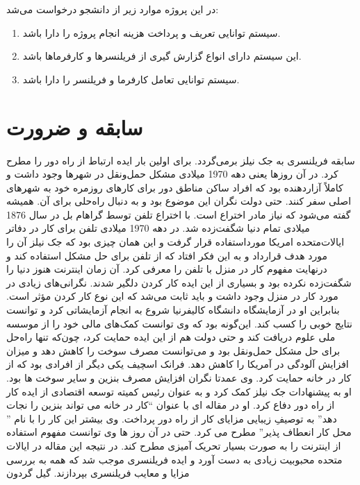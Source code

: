  در این پروژه موارد زیر از دانشجو درخواست می‌شد:
\begin{enumerate}
	\item
سیستم توانایی تعریف و پرداخت هزینه انجام پروژه را دارا باشد.
\item
این سیستم دارای انواع گزارش ‌گیری از فریلنسرها و کارفرماها باشد.
\item
سیستم توانایی تعامل کارفرما و فریلنسر را دارا باشد.
\end{enumerate}

\section{سابقه و ضرورت}
سابقه فریلنسری به جک نیلز 
برمی‌گردد. برای اولین بار ایده ارتباط از راه دور را مطرح کرد.
در آن روزها یعنی دهه 1970 میلادی مشکل حمل‌ونقل در شهرها وجود داشت و کاملاً آزاردهنده بود که افراد ساکن مناطق دور برای کارهای روزمره خود به شهرهای اصلی سفر کنند.
حتی دولت نگران این موضوع بود و به دنبال راه‌حلی برای آن. همیشه گفته می‌شود که نیاز مادر اختراع است.
با اختراع تلفن توسط گراهام بل در سال 1876 میلادی تمام دنیا شگفت‌زده شد. در دهه 1970 میلادی تلفن برای کار در دفاتر ایالات‌متحده امریکا مورداستفاده قرار گرفت و این همان چیزی بود که جک نیلز آن را مورد هدف قرارداد و به این فکر افتاد که از تلفن برای حل مشکل استفاده کند و درنهایت مفهوم کار در منزل با تلفن را معرفی کرد.
آن زمان اینترنت هنوز دنیا را شگفت‌زده نکرده بود و بسیاری از این ایده کار کردن دلگیر شدند.
نگرانی‌های زیادی در مورد کار در منزل وجود داشت و باید ثابت می‌شد که این نوع کار کردن مؤثر است.
بنابراین او در آزمایشگاه دانشگاه کالیفرنیا شروع به انجام آزمایشاتی کرد و توانست نتایج خوبی را کسب کند.
این‌گونه بود که وی توانست کمک‌های مالی خود را از موسسه ملی علوم دریافت کند و حتی دولت هم از این ایده حمایت کرد، چون‌که تنها راه‌حل برای حل مشکل حمل‌ونقل بود و می‌توانست مصرف سوخت را کاهش دهد و میزان افزایش آلودگی در آمریکا را کاهش دهد. 
فرانک اسچیف
 یکی دیگر از افرادی بود که از کار در خانه حمایت کرد. وی عمدتا نگران افزایش مصرف بنزین و سایر سوخت ها بود. او به پیشنهادات جک نیلز کمک کرد و به عنوان رئیس کمیته توسعه اقتصادی از ایده کار از راه دور دفاع کرد. او در مقاله ای با عنوان “کار در خانه می تواند بنزین را نجات دهد” به توصیفِ زیبایی مزایای کار از راه دور پرداخت. وی بیشتر این کار را با نام ” محل کار انعطاف پذیر” مطرح می کرد. حتی در آن روز ها وی توانست مفهوم استفاده از اینترنت را به صورت بسیار تحریک آمیزی مطرح کند. در نتیجه این مقاله در ایالات متحده محبوبیت زیادی به دست آورد و ایده فریلنسری موجب شد که همه به بررسی مزایا و معایب فریلنسری بپردازند. 
 گیل گردون
